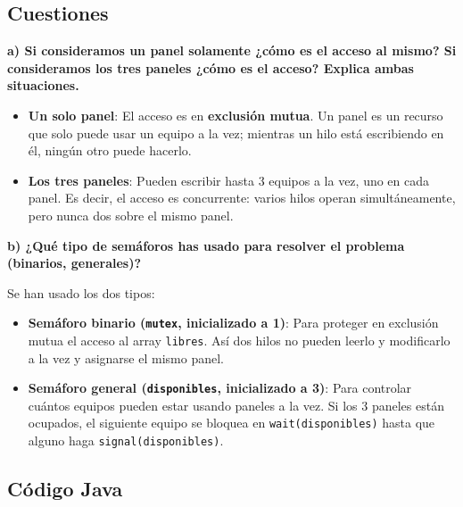 \documentclass[12pt,a4paper]{article}
\begin{document}
\subsection{Cuestiones}

\textbf{a) Si consideramos un panel solamente ¿cómo es el acceso al mismo? Si consideramos los tres paneles ¿cómo es el acceso? Explica ambas situaciones.}

\begin{itemize}
    \item \textbf{Un solo panel}: El acceso es en \textbf{exclusión mutua}. Un panel es un recurso que solo puede usar un equipo a la vez; mientras un hilo está escribiendo en él, ningún otro puede hacerlo.
    \item \textbf{Los tres paneles}: Pueden escribir hasta 3 equipos a la vez, uno en cada panel. Es decir, el acceso es concurrente: varios hilos operan simultáneamente, pero nunca dos sobre el mismo panel.
\end{itemize}

\textbf{b) ¿Qué tipo de semáforos has usado para resolver el problema (binarios, generales)?}

Se han usado los dos tipos:
\begin{itemize}
    \item \textbf{Semáforo binario (\texttt{mutex}, inicializado a 1)}: Para proteger en exclusión mutua el acceso al array \texttt{libres}. Así dos hilos no pueden leerlo y modificarlo a la vez y asignarse el mismo panel.
    \item \textbf{Semáforo general (\texttt{disponibles}, inicializado a 3)}: Para controlar cuántos equipos pueden estar usando paneles a la vez. Si los 3 paneles están ocupados, el siguiente equipo se bloquea en \texttt{wait(disponibles)} hasta que alguno haga \texttt{signal(disponibles)}.
\end{itemize}

\subsection{Código Java}
\end{document}
